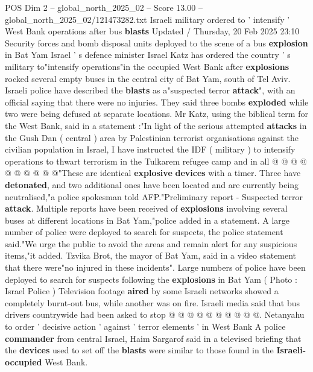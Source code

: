 \begin{textsample}{POS Dim 2 – global\_north\_2025\_02 – Score 13.00 – global\_north\_2025\_02/121473282.txt}  \label{ex:f2_pos_436}
Israeli military ordered to ' intensify ' West Bank operations after bus \textbf{blasts} Updated / Thursday, 20 Feb 2025 23:10 Security forces and bomb disposal units deployed to the scene of a bus \textbf{explosion} in Bat Yam Israel ' s defence minister Israel Katz has ordered the country ' s military to"intensify operations"in the occupied West Bank after \textbf{explosions} rocked several empty buses in the central city of Bat Yam, south of Tel Aviv.
Israeli police have described the \textbf{blasts} as a"suspected terror \textbf{attack}", with an official saying that there were no injuries.
They said three bombs \textbf{exploded} while two were being defused at separate locations.
Mr Katz, using the biblical term for the West Bank, said in a statement :"In light of the serious attempted \textbf{attacks} in the Gush Dan ( central ) area by Palestinian terrorist organisations against the civilian population in Israel, I have instructed the IDF ( military ) to intensify operations to thwart terrorism in the Tulkarem refugee camp and in all @ @ @ @ @ @ @ @ @ @"These are identical \textbf{explosive} \textbf{devices} with a timer.
Three have \textbf{detonated}, and two additional ones have been located and are currently being neutralised,"a police spokesman told AFP."Preliminary report - Suspected terror \textbf{attack}.
Multiple reports have been received of \textbf{explosions} involving several buses at different locations in Bat Yam,"police added in a statement.
A large number of police were deployed to search for suspects, the police statement said."We urge the public to avoid the areas and remain alert for any suspicious items,"it added.
Tzvika Brot, the mayor of Bat Yam, said in a video statement that there were"no injured in these incidents".
Large numbers of police have been deployed to search for suspects following the \textbf{explosions} in Bat Yam ( Photo : Israel Police ) Television footage \textbf{aired} by some Israeli networks showed a completely burnt-out bus, while another was on fire.
Israeli media said that bus drivers countrywide had been asked to stop @ @ @ @ @ @ @ @ @ @.
Netanyahu to order ' decisive action ' against ' terror elements ' in West Bank A police \textbf{commander} from central Israel, Haim Sargarof said in a televised briefing that the \textbf{devices} used to set off the \textbf{blasts} were similar to those found in the \textbf{Israeli-occupied} West Bank.

\end{textsample}
